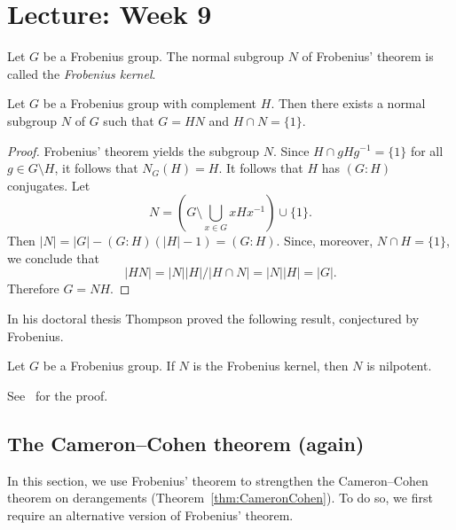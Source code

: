 \section{Lecture: Week 9}
 
\begin{definition}
  Let $G$ be a Frobenius group. The normal subgroup 
  $N$ of Frobenius' theorem is called the \emph{Frobenius kernel}. 
\end{definition}

\begin{proposition}
\label{pro:Frobenius_groups}
  Let $G$ be a Frobenius group with complement $H$. 
  Then there exists a normal subgroup $N$ of $G$ 
  such that 
  $G=HN$ and $H\cap N=\{1\}$.
\end{proposition}

\begin{proof}
  Frobenius' theorem yields the subgroup $N$. Since 
  $H\cap gHg^{-1}=\{1\}$ for all $g\in G\setminus H$, 
  it follows that 
  $N_G(H)=H$. It follows that $H$
  has $(G:H)$ conjugates. 
  Let 
  \[
  N=\left( G\setminus\bigcup_{x\in G}xHx^{-1}\right)\cup\{1\}.
  \]
  Then  
  $|N|=|G|-(G:H)(|H|-1)=(G:H)$.
  Since, moreover, $N\cap H=\{1\}$, we conclude that
  \[
  |HN|=|N||H|/|H\cap N|=|N||H|=|G|.
  \]
  Therefore $G=NH$.
\end{proof}

\begin{optional}
In his doctoral thesis Thompson proved the following result, conjectured
by Frobenius. 

\begin{theorem}[Thompson]
    Let $G$ be a Frobenius group. If $N$ is the Frobenius kernel, then $N$ 
    is nilpotent.
\end{theorem}

See~\cite[Theorem 6.24]{MR2426855} for the proof.
\end{optional}

\subsection{The Cameron--Cohen theorem (again)}

In this section, we use Frobenius’ theorem to strengthen the Cameron--Cohen theorem on derangements (Theorem~\ref{thm:CameronCohen}). To do so, we first require an alternative version of Frobenius’ theorem.



